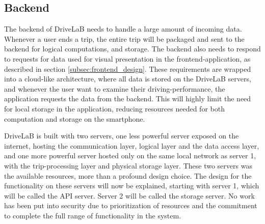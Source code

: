 \subsection{Backend}\label{subsec:backend_design}
The backend of DriveLaB needs to handle a large amount of incoming data. Whenever a user ends a trip, the entire trip will be packaged and sent to the backend for logical computations, and storage. The backend also needs to respond to requests for data used for visual presentation in the frontend-application, as described in section \ref{subsec:frontend_design}. These requirements are wrapped into a cloud-like architecture, where all data is stored on the DriveLaB servers, and whenever the user want to examine their driving-performance, the application requests the data from the backend. This will highly limit the need for local storage in the application, reducing resources needed for both computation and storage on the smartphone. 

DriveLaB is built with two servers, one less powerful server exposed on the internet, hosting the communication layer, logical layer and the data access layer, and one more powerful server hosted only on the same local network as server 1, with the trip-processing layer and physical storage layer. These two servers was the available resources, more than a profound design choice. The design for the functionality on these servers will now be explained, starting with server 1, which will be called the API server. Server 2 will be called the storage server. No work has been put into security due to prioritization of resources and the commitment to complete the full range of functionality in the system. 